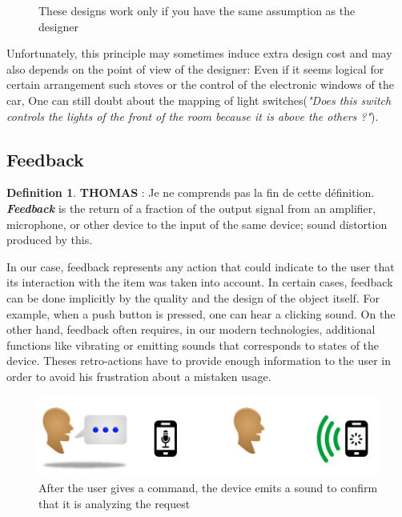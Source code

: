\documentclass[a4paper,11pt] {article}
\theoremstyle{definition}
\begin{document}
\begin{minipage}{\linewidth}
\begin{minipage}{0.45\linewidth}
\begin{figure}[H]
              \caption{These designs work only if you have the same assumption as the designer}
          \end{figure}
      \end{minipage}
  \end{minipage}
  \bigskip


Unfortunately, this principle may sometimes induce extra design cost and may also depends on the point of view of the designer: Even if it seems logical for certain arrangement such stoves or the control of the electronic windows of the car, One can still doubt about the mapping of light switches(\textit{"Does this switch controls  the lights of the front of the room because it is above the others ?"}). %
\subsection{Feedback}
\newtheorem{mydef}{Definition}
\begin{mydef}
\textbf{THOMAS} : Je ne comprends pas la fin de cette définition.
\textit{\textbf{Feedback}} is the return of a fraction of the output signal from an amplifier, microphone, or other device to the input of the same device; sound distortion produced by this.%
\end{mydef}

In our case, feedback represents any action that could indicate to the user that its interaction with the item was taken into account. In certain cases, feedback can be done implicitly by the quality and the design of the object itself. For example, when a push button is  pressed, one can hear a clicking sound. On the other hand, feedback often requires, in our modern technologies, additional functions like vibrating or emitting sounds that corresponds to states of the device. Theses retro-actions have to provide enough information to the user in order to avoid his frustration about a mistaken usage.
\begin{figure}[h]
\centering
\includegraphics[scale=0.5]{retro-action-speaking.jpg}
\caption{After the user gives a command, the device emits a sound to confirm that it is analyzing the request}
\end{figure}
\end{document}
